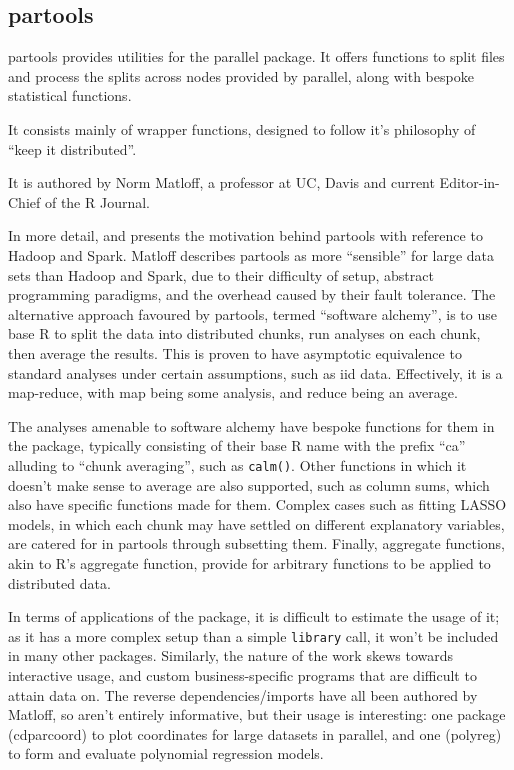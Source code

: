 \hypertarget{sec:partools}{%
    \subsection{partools}\label{sec:partools}}

partools provides utilities for the parallel
package\cite{matloff16softw_alchemy}. It offers functions to split
files and process the splits across nodes provided by parallel, along
with bespoke statistical functions.

It consists mainly of wrapper functions, designed to follow it's
philosophy of ``keep it distributed''.

It is authored by Norm Matloff, a professor at UC, Davis and current
Editor-in-Chief of the R Journal.

In more detail, \cite{matloff15} and \cite{matloff17} presents the
motivation behind partools with reference to Hadoop and Spark. Matloff
describes partools as more ``sensible'' for large data sets than Hadoop
and Spark, due to their difficulty of setup, abstract programming
paradigms, and the overhead caused by their fault tolerance. The
alternative approach favoured by partools, termed ``software alchemy'',
is to use base R to split the data into distributed chunks, run analyses
on each chunk, then average the results. This is proven to have
asymptotic equivalence to standard analyses under certain assumptions,
such as iid data. Effectively, it is a map-reduce, with map being some
analysis, and reduce being an average.

The analyses amenable to software alchemy have bespoke functions for
them in the package, typically consisting of their base R name with the
prefix ``ca'' alluding to ``chunk averaging'', such as
\texttt{calm()}. Other functions in which it
doesn't make sense to average are also supported, such as column sums,
which also have specific functions made for them. Complex cases such as
fitting LASSO models, in which each chunk may have settled on different
explanatory variables, are catered for in partools through subsetting
them. Finally, aggregate functions, akin to R's aggregate function,
provide for arbitrary functions to be applied to distributed data.

In terms of applications of the package, it is difficult to estimate the
usage of it; as it has a more complex setup than a simple
\texttt{library} call, it won't be included in many other packages.
Similarly, the nature of the work skews towards interactive usage, and
custom business-specific programs that are difficult to attain data on.
The reverse dependencies/imports have all been authored by Matloff, so
aren't entirely informative, but their usage is interesting: one package
(cdparcoord) to plot coordinates for large datasets in parallel, and one
(polyreg) to form and evaluate polynomial regression models.

